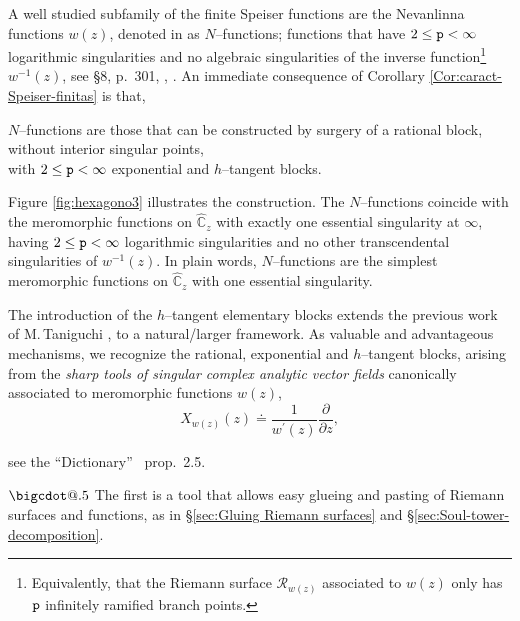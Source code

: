 \documentclass[final,3p,times]{elsarticle}
\makeatletter
\newcommand{\CW}{\ensuremath{{\widehat{\mathbb C}}}}
\newcommand{\R}{\ensuremath{{\mathcal R}}}
\newcommand{\del}[2]{\frac{\partial #1}{\partial #2}}
\newcommand*\bigcdot{\mathpalette\bigcdot@{.5}}
\newcommand*\bigcdot@[2]{\mathbin{\vcenter{\hbox{\scalebox{#2}{$\m@th#1\bullet$}}}}}
\theoremstyle{definition}
\makeatother
\begin{document}
\smallskip

\noindent
A well studied subfamily of the finite Speiser functions are the 
Nevanlinna functions $w(z)$,
denoted in \cite{EremenkoMerenkov2} as $N$--functions;
functions that have $2\leq {\tt p} < \infty$ logarithmic singularities 
and no algebraic singularities of the inverse function\footnote{
Equivalently, that the Riemann surface $\R_{w(z)}$ associated to $w(z)$ only has $\tt p$ 
infinitely ramified branch points.}
$w^{-1}(z)$, 
see \cite{Nevanlinna1} \S8, \cite{Nevanlinna2} p.\ 301, \cite{BergweilerEremenko}, 
\cite{AlvarezMucino4}.
An immediate consequence of Corollary \ref{Cor:caract-Speiser-finitas} is that, 

\smallskip

{\it 
\begin{center}
$N$--functions 
are those that can be 
constructed by 
surgery of a rational block, 
without interior singular points, 
\\
with $2 \leq {\tt p} < \infty $ 
exponential and $h$--tangent blocks.
\end{center}
}
\smallskip

\noindent 
Figure \ref{fig:hexagono3} illustrates the construction.
The $N$--functions coincide with the meromorphic functions
on $\CW_z$ with exactly one essential singularity at $\infty$,
having
$2\leq {\tt p} < \infty$ logarithmic singularities
and no other transcendental singularities of $w^{-1}(z)$.
In plain words, $N$--functions are the simplest 
meromorphic functions on $\CW_z$ with one essential singularity.


The introduction
of the $h$--tangent elementary blocks extends the previous 
work of M.\,Taniguchi 
\cite{Taniguchi1},
\cite{Taniguchi2} 
to a natural/larger framework. 
As valuable and advantageous mechanisms, we recognize
the rational, exponential and $h$--tangent blocks,
arising from the \emph{sharp tools of 
singular complex analytic vector fields} canonically associated to 
meromorphic functions $w(z)$,
\begin{equation}
\label{eq:vector-field-from-function}
X_{w(z)}(z) \doteq \frac{1}{w^\prime(z)} \del{}{z}, 
\end{equation}

\noindent
see the ``Dictionary'' \cite{AlvarezMucino3}\, prop.\, 2.5.

\noindent
$\bigcdot$
The first is a tool that allows easy glueing and pasting of Riemann surfaces and functions, 
as in \S\ref{sec:Gluing Riemann surfaces} and
\S\ref{sec:Soul-tower-decomposition}.
\end{document}
